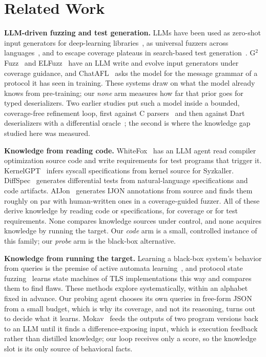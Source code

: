 \section{Related Work}

\textbf{LLM-driven fuzzing and test generation.} LLMs have been used as
zero-shot input generators for deep-learning libraries~\cite{deng2023titanfuzz},
as universal fuzzers across languages~\cite{xia2024fuzz4all}, and to escape
coverage plateaus in search-based test generation~\cite{lemieux2023codamosa}.
G$^2$Fuzz~\cite{zhang2025g2fuzz} and ELFuzz~\cite{chen2025elfuzz} have an LLM
write and evolve input generators under coverage guidance, and
ChatAFL~\cite{meng2024chatafl} asks the model for the message grammar of a
protocol it has seen in training. These systems draw on what the model
already knows from pre-training; our \emph{none} arm measures how far that
prior goes for typed deserializers. Two
earlier studies put such a model inside a bounded, coverage-free refinement
loop, first against C parsers~\grammarcite{} and then against Dart
deserializers with a differential oracle~\dartcite{}; the second is where
the knowledge gap studied here was measured.

\textbf{Knowledge from reading code.} WhiteFox~\cite{yang2024whitefox} has
an LLM agent read compiler optimization source code and write requirements
for test programs that trigger it. KernelGPT~\cite{yang2025kernelgpt}
infers syscall specifications from kernel source for Syzkaller.
DiffSpec~\cite{rao2024diffspec} generates differential tests from natural-language
specifications and code artifacts. AIJon~\cite{vadayath2026aijon} generates
IJON annotations from source and finds them roughly on par with human-written
ones in a coverage-guided fuzzer. All of these derive knowledge by reading
code or specifications, for coverage or for test requirements. None compares
knowledge sources under control, and none acquires knowledge by running the
target. Our \emph{code} arm is a small, controlled instance of this family;
our \emph{probe} arm is the black-box alternative.

\textbf{Knowledge from running the target.} Learning a black-box system's
behavior from queries is the premise of active automata
learning~\cite{angluin1987learning}, and protocol state
fuzzing~\cite{deruiter2015protocol} learns state machines of TLS
implementations this way and compares them to find flaws. These methods
explore systematically, within an alphabet fixed in advance. Our probing
agent chooses its own queries in free-form JSON from a small budget, which is
why its coverage, and not its reasoning, turns out to decide what it learns.
Mokav~\cite{etemadi2025mokav} feeds the outputs of two program versions back
to an LLM until it finds a difference-exposing input, which is execution
feedback rather than distilled knowledge; our loop receives only a score, so
the knowledge slot is its only source of behavioral facts.

